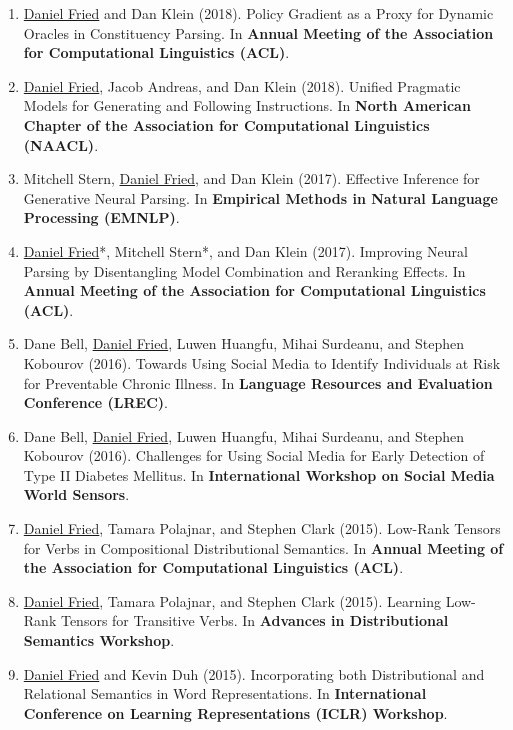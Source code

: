 \begin{enumerate}[leftmargin=-1mm,partopsep=0pt]
\item \underline{Daniel Fried} and Dan Klein (2018). Policy Gradient as a Proxy for Dynamic Oracles in Constituency Parsing. In \textbf{Annual Meeting of the Association for Computational Linguistics (ACL)}.

\item \underline{Daniel Fried}, Jacob Andreas, and Dan Klein (2018). Unified Pragmatic Models for Generating and Following Instructions. In \textbf{North American Chapter of the Association for Computational Linguistics (NAACL)}.

\item Mitchell Stern, \underline{Daniel Fried}, and Dan Klein (2017). Effective Inference for Generative Neural Parsing. In \textbf{Empirical Methods in Natural Language Processing (EMNLP)}.

\item \underline{Daniel Fried}*, Mitchell Stern*, and Dan Klein (2017). Improving Neural Parsing by Disentangling Model Combination and Reranking Effects. In \textbf{Annual Meeting of the Association for Computational Linguistics (ACL)}.

\item Dane Bell, \underline{Daniel Fried}, Luwen Huangfu, Mihai Surdeanu, and Stephen Kobourov (2016). Towards Using Social Media to Identify Individuals at Risk for Preventable Chronic Illness. In \textbf{Language Resources and Evaluation Conference (LREC)}.

\item Dane Bell, \underline{Daniel Fried}, Luwen Huangfu, Mihai Surdeanu, and Stephen Kobourov (2016). Challenges for Using Social Media for Early Detection of Type II Diabetes Mellitus. In \textbf{International Workshop on Social Media World Sensors}.

\item \underline{Daniel Fried}, Tamara Polajnar, and Stephen Clark (2015). Low-Rank Tensors for Verbs in Compositional Distributional Semantics. In \textbf{Annual Meeting of the Association for Computational Linguistics (ACL)}.

\item \underline{Daniel Fried}, Tamara Polajnar, and Stephen Clark (2015). Learning Low-Rank Tensors for Transitive Verbs. In \textbf{Advances in Distributional Semantics Workshop}.

\item \underline{Daniel Fried} and Kevin Duh (2015). Incorporating both Distributional and Relational Semantics in Word Representations. In \textbf{International Conference on Learning Representations (ICLR) Workshop}.


\end{enumerate}
